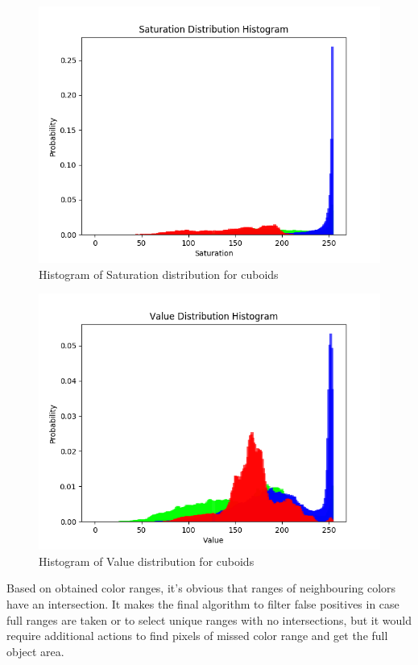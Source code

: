 \documentclass{ctuthesis}
\begin{document}
\begin{figure}[htbp]
    \centering
    \includegraphics[width=\textwidth]{HSV_tot_S.png}
    \caption{Histogram of Saturation distribution for cuboids}
    \label{fig:tot_S}
\end{figure}

\begin{figure}[htbp]
    \centering
    \includegraphics[width=\textwidth]{HSV_tot_V.png}
    \caption{Histogram of Value distribution for cuboids}
    \label{fig:tot_V}
\end{figure}

Based on obtained color ranges, it's obvious that ranges of neighbouring colors have an intersection. It makes the final algorithm to filter false positives in case full ranges are taken or to select unique ranges with no intersections, but it would require additional actions to find pixels of missed color range and get the full object area. 
\end{document}
